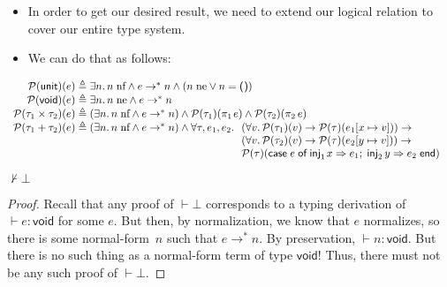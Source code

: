 \documentclass{lecturenotes}
\newcommand{\utype}{\textsf{unit}\xspace}
\newcommand{\unit}{\ensuremath{\textsf{(}\mkern0.5mu\textsf{)}}}
\newcommand{\prodtype}[2]{\ensuremath{#1 \times #2}}
\newcommand{\projl}[1]{\ensuremath{\pi_1\mkern2mu#1}}
\newcommand{\projr}[1]{\ensuremath{\pi_2\mkern3mu#1}}
\newcommand{\sumtype}[2]{\ensuremath{#1 + #2}}
\newcommand{\injl}[1]{\ensuremath{\textsf{inj}_1\mkern2mu#1}}
\newcommand{\injr}[1]{\ensuremath{\textsf{inj}_2\mkern3mu#1}}
\newcommand{\case}[5]{\ensuremath{\textsf{case}\mkern5mu#1\mkern5mu\textsf{of}\mkern5mu\injl{#2} \Rightarrow #3;\mkern5mu\injr{#4} \Rightarrow #5\mkern5mu\textsf{end}}}
\newcommand{\vtype}{\textsf{void}\xspace}
\newcommand{\neutral}[1]{#1\;\text{ne}}
\newcommand{\nf}[1]{#1\;\text{nf}}
\begin{document}
\begin{itemize}
\item In order to get our desired result, we need to extend our logical relation to cover our entire type system.
\item We can do that as follows:
\end{itemize}

$$
\begin{array}{r@{\;\triangleq\;}l}
  \mathcal{P}(\utype)(e) & \exists n.\,\nf{n} \land e \to^\ast n \land (\neutral{n} \lor n = \unit)\\
  \mathcal{P}(\vtype)(e) & \exists n.\,\neutral{n} \land e \to^\ast n\\
  \mathcal{P}(\prodtype{\tau_1}{\tau_2})(e) & (\exists n.\, \nf{n} \land e \to^\ast n) \land \mathcal{P}(\tau_1)(\projl{e}) \land \mathcal{P}(\tau_2)(\projr{e})\\
  \mathcal{P}(\sumtype{\tau_1}{\tau_2})(e) & (\exists n.\,\nf{n} \land e \to^\ast n) \land \forall \tau, e_1, e_2.\,\begin{array}[t]{l}(\forall v.\, \mathcal{P}(\tau_1)(v) \to \mathcal{P}(\tau)(e_1[x \mapsto v])) \to\\
    (\forall v.\, \mathcal{P}(\tau_2)(v) \to \mathcal{P}(\tau)(e_2[y \mapsto v])) \to\\
    \mathcal{P}(\tau)(\case{e}{x}{e_1}{y}{e_2})
    \end{array}
\end{array}
$$

\begin{cor}[Consistency]
  $\not\vdash \bot$
\end{cor}
\begin{proof}
  Recall that any proof of $\vdash \bot$ corresponds to a typing derivation of $\vdash e : \vtype$ for some $e$.
  But then, by normalization, we know that $e$ normalizes, so there is some normal-form~$n$ such that $e \to^\ast n$.
  By preservation, $\vdash n : \vtype$.
  But there is no such thing as a normal-form term of type $\vtype$!
  Thus, there must not be any such proof of $\vdash \bot$.
\end{proof}
\end{document}
